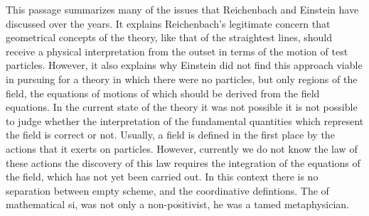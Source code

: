 \documentclass[draft]{article}
\begin{document}
%
This passage summarizes many of the issues that Reichenbach and Einstein have discussed over the years. It explains Reichenbach's legitimate concern that geometrical concepts of the theory, like that of the straightest lines, should receive a physical interpretation from the outset in terms of the motion of test particles. However, it also explains why Einstein did not find this approach viable in pursuing for a theory in which there were no particles, but only regions of the field, the equations of motions of which should be derived from the field equations. In the current state of the theory it was not possible it is not possible to judge whether the interpretation of the fundamental quantities which represent the field is correct or not. Usually, a field is defined in the first place by the actions that it exerts on particles. However, currently we do not know the law of these actions the discovery of this law requires the integration of the equations of the field, which has not yet been carried out. In this context there is no separation between empty scheme, and the coordinative defintions. The of mathematical si, was not only a non-positivist, he was a tamed metaphysician. 



\printshorthands
\printbibliography
\end{document}
